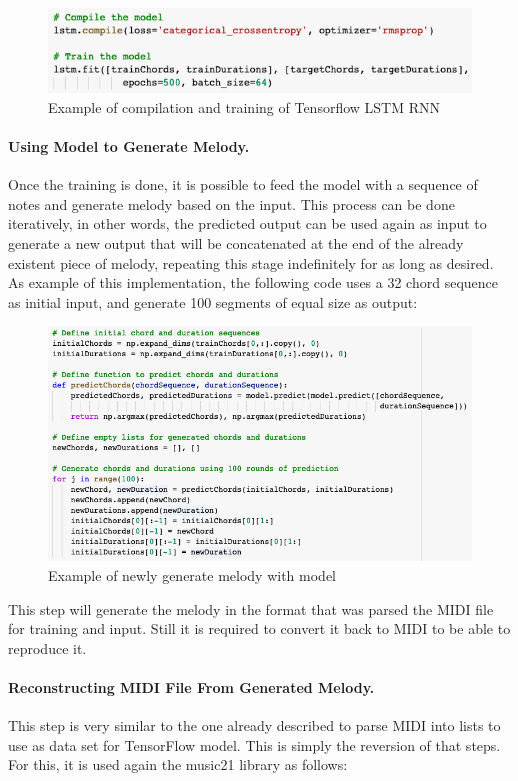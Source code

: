 \begin{figure}[h!]
  \includegraphics[width=\linewidth]{image/fig_JDF23.png}
  \caption{Example of compilation and training of Tensorflow LSTM RNN }
\end{figure}

\paragraph{Using Model to Generate Melody.}
Once the training is done, it is possible to feed the model with a sequence of notes and
generate melody based on the input. This process can be done iteratively, in other words,
the predicted output can be used again as input to generate a new output that will be
concatenated at the end of the already existent piece of melody, repeating this stage
indefinitely for as long as desired. As example of this implementation, the following code
uses a 32 chord sequence as initial input, and generate 100 segments of equal size as
output:

\begin{figure}[h!]
  \includegraphics[width=\linewidth]{image/fig_JDF24.png}
  \caption{Example of newly generate melody with model }
\end{figure}

This step will generate the melody in the format that was parsed the MIDI file for
training and input. Still it is required to convert it back to MIDI to be able to
reproduce it.

\paragraph{Reconstructing MIDI File From Generated Melody.} This step is very similar to the one
already described to parse MIDI into lists to use as data set for TensorFlow model. This
is simply the reversion of that steps. For this, it is used again the music21 library as
follows:

